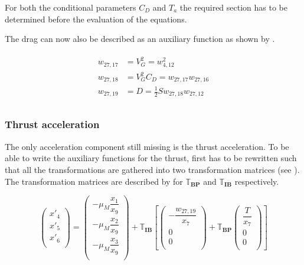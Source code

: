 For both the conditional parameters $C_{D}$ and $T_{a}$  the required section has to be determined before the evaluation of the equations.

The drag can now also be described as an auxiliary function as shown by .

\begin{align} \label{eq:dragAuxF}
\begin{split}
w_{27,17} &= V_{G}^{2} =  w_{4,12}^{2} \\
w_{27,18} &= V_{G}^{2}C_{D} = w_{27,17}w_{27,16} \\
w_{27,19} &= D = \frac{1}{2} S w_{27,18}w_{27,12} \\
\end{split}
\end{align}



\subsubsection{Thrust acceleration}
\label{subsubsec:tsiThrust}
The only acceleration component still missing is the thrust acceleration. To be able to write the auxiliary functions for the thrust,  first has to be rewritten such that all the transformations are gathered into two transformation matrices (see ). The transformation matrices are described by  for $\mathbb{T}_{\mathbf{BP}}$ and $\mathbb{T}_{\mathbf{IB}}$ respectively.

\begin{equation} \label{eq:accAux}
\begin{pmatrix}
x'_{4}\\
x'_{5}\\
x'_{6}\\
\end{pmatrix}
=
\begin{pmatrix}
-\mu_{M}\dfrac{x_{1}}{x_{9}}\\
-\mu_{M}\dfrac{x_{2}}{x_{9}}\\
-\mu_{M}\dfrac{x_{3}}{x_{9}}\\
\end{pmatrix}+
\mathbb{T}_{\mathbf{IB}}\left[
\begin{pmatrix}
-\dfrac{w_{27,19}}{x_{7}}\\
0\\
0\\
\end{pmatrix}
+ 
\mathbb{T}_{\mathbf{BP}}
\begin{pmatrix}
\dfrac{T}{x_{7}}\\
0\\
0\\
\end{pmatrix}
\right]
\end{equation}


